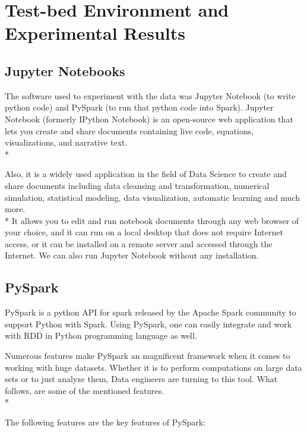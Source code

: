 \section{Test-bed Environment and Experimental Results}
\label{sec:experiments}

\subsection{Jupyter Notebooks}

The software used to experiment with the data was Jupyter Notebook (to write python code) and PySpark (to run that python code into Spark).
Jupyter Notebook (formerly IPython Notebook) is an open-source web application that lets you create and share documents containing live code, equations, visualizations, and narrative text.\\*

Also, it is a widely used application in the field of Data Science to create and share documents including data cleansing and transformation, numerical simulation, statistical modeling, data visualization, automatic learning and much more.\\*
It allows you to edit and run notebook documents through any web browser of your choice, and it can run on a local desktop that does not require Internet access, or it can be installed on a remote server and accessed through the Internet. We can also run Jupyter Notebook without any installation.

\subsection{PySpark}
PySpark is a python API for spark released by the Apache Spark community to support Python with Spark. Using PySpark, one can easily integrate and work with RDD in Python programming language as well. 

Numerous features make PySpark an magnificent framework when it comes to working with huge datasets. Whether it is to perform computations on large data sets or to just analyze them, Data engineers are turning to this tool. What follows, are some of the mentioned features.\\*

\noindent
The following features are the key features of PySpark:

